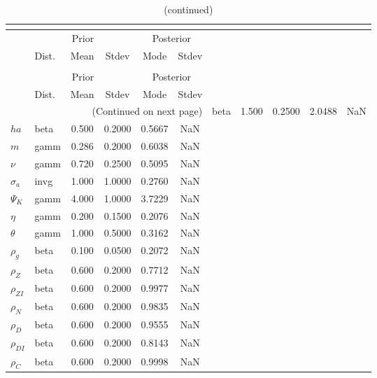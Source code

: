  
\begin{center}
\begin{longtable}{llcccc} 
\caption{Results from posterior maximization (parameters)}\\
 \label{Table:Posterior:1}\\
\toprule 
  & \multicolumn{3}{c}{Prior}  &  \multicolumn{2}{c}{Posterior} \\
  \cmidrule(r{.75em}){2-4} \cmidrule(r{.75em}){5-6}
  & Dist. & Mean  & Stdev & Mode & Stdev \\ 
\midrule \endfirsthead 
\caption{(continued)}\\
 \bottomrule 
  & \multicolumn{3}{c}{Prior}  &  \multicolumn{2}{c}{Posterior} \\
  \cmidrule(r{.75em}){2-4} \cmidrule(r{.75em}){5-6}
  & Dist. & Mean  & Stdev & Mode & Stdev \\ 
\midrule \endhead 
\bottomrule \multicolumn{6}{r}{(Continued on next page)}\endfoot 
\bottomrule\endlastfoot 
${\gamma}$ & beta &   1.500 & 0.2500 &   2.0488 &     NaN \\ 
${ha}$ & beta &   0.500 & 0.2000 &   0.5667 &     NaN \\ 
${m}$ & gamm &   0.286 & 0.2000 &   0.6038 &     NaN \\ 
$\nu$ & gamm &   0.720 & 0.2500 &   0.5095 &     NaN \\ 
${\sigma_a}$ & invg &   1.000 & 1.0000 &   0.2760 &     NaN \\ 
${\Psi_K}$ & gamm &   4.000 & 1.0000 &   3.7229 &     NaN \\ 
${\eta}$ & gamm &   0.200 & 0.1500 &   0.2076 &     NaN \\ 
${\theta}$ & gamm &   1.000 & 0.5000 &   0.3162 &     NaN \\ 
${\rho_g}$ & beta &   0.100 & 0.0500 &   0.2072 &     NaN \\ 
${\rho_Z}$ & beta &   0.600 & 0.2000 &   0.7712 &     NaN \\ 
${\rho_{ZI}}$ & beta &   0.600 & 0.2000 &   0.9977 &     NaN \\ 
${\rho_N}$ & beta &   0.600 & 0.2000 &   0.9835 &     NaN \\ 
${\rho_D}$ & beta &   0.600 & 0.2000 &   0.9555 &     NaN \\ 
${\rho_{DI}}$ & beta &   0.600 & 0.2000 &   0.8143 &     NaN \\ 
${\rho_C}$ & beta &   0.600 & 0.2000 &   0.9998 &     NaN \\ 
\end{longtable}
 \end{center}
